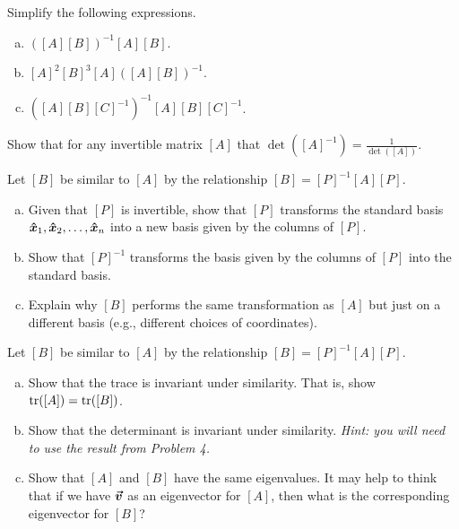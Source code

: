 \documentclass[12pt]{article} %
\begin{document}
\begin{problem}
Simplify the following expressions.
\begin{enumerate}[(a)]
    \item $([A][B])^{-1} [A] [B]$.
    \item $[A]^2[B]^3[A] ([A][B])^{-1}$.
    \item $([A][B][C]^{-1})^{-1} [A][B] [C]^{-1}$.
\end{enumerate}
\end{problem}

\begin{problem}
Show that for any invertible matrix $[A]$ that $\det([A]^{-1})=\frac{1}{\det([A])}$.
\end{problem}

\begin{problem}
Let $[B]$ be similar to $[A]$ by the relationship $[B]=[P]^{-1} [A] [P]$.
\begin{enumerate}[(a)]
    \item Given that $[P]$ is invertible, show that $[P]$ transforms the standard basis $\boldsymbol{\hat{x}}_1,\boldsymbol{\hat{x}}_2,\dots,\boldsymbol{\hat{x}}_n$ into a new basis given by the columns of $[P]$.
    \item Show that $[P]^{-1}$ transforms the basis given by the columns of $[P]$ into the standard basis.
    \item Explain why $[B]$ performs the same transformation as $[A]$ but just on a different basis (e.g., different choices of coordinates).
\end{enumerate}
\end{problem}

\begin{problem}
Let $[B]$ be similar to $[A]$ by the relationship $[B]=[P]^{-1} [A] [P]$.  
\begin{enumerate}[(a)]
    \item Show that the trace is invariant under similarity. That is, show $\mathrm{tr} ([A]) = \mathrm{tr}([B])$.
    \item Show that the determinant is invariant under similarity. \emph{Hint: you will need to use the result from Problem 4.}
    \item Show that $[A]$ and $[B]$ have the same eigenvalues. It may help to think that if we have $\boldsymbol{\boldsymbol{\vec{v}}}$ as an eigenvector for $[A]$, then what is the corresponding eigenvector for $[B]$?
\end{enumerate}
\end{problem}
\end{document}
